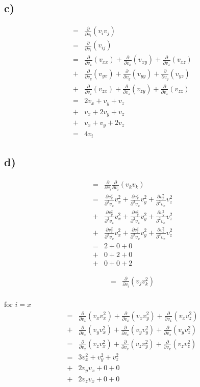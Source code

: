 \documentclass[paper=a4, fontsize=12pt]{scrartcl}
\begin{document}
\subsection*{c)}
\begin{align*}
=&\frac{\partial}{\partial v_i}(v_i v_j)\\
= &\frac{\partial}{\partial v_i}(v_{ij})\\
=&
 \frac{\partial}{\partial v_x}(v_{xx})
+\frac{\partial}{\partial v_x}(v_{xy})
+\frac{\partial}{\partial v_x}(v_{xz})\\
+& 
 \frac{\partial}{\partial v_y}(v_{yx})
+\frac{\partial}{\partial v_y}(v_{yy})
+\frac{\partial}{\partial v_y}(v_{yz})\\
+& 
 \frac{\partial}{\partial v_z}(v_{zx})
+\frac{\partial}{\partial v_z}(v_{zy})
+\frac{\partial}{\partial v_z}(v_{zz})\\
=& 
	2v_x + v_y + v_z\\
+&	v_x + 2v_y + v_z\\
+& 	v_x + v_y + 2v_z \\
=& 4v_i
\end{align*}

\subsection*{d)}
\begin{align*}
=&
\frac{\partial}{\partial v_i} \frac{\partial}{\partial v_i}(v_k v_k)\\
=& 
  \frac{\partial v^2_x}{\partial ^2 v_x}  v_x^2
+ \frac{\partial v^2_x}{\partial ^2 v_x}  v_y^2
+ \frac{\partial v^2_x}{\partial ^2 v_x}  v_z^2\\
+& 
  \frac{\partial v^2_y}{\partial ^2 v_x}  v_x^2
+ \frac{\partial v^2_y}{\partial ^2 v_x}  v_y^2
+ \frac{\partial v^2_y}{\partial ^2 v_x}  v_z^2\\
+&
  \frac{\partial v^2_z}{\partial ^2 v_x}  v_x^2
+ \frac{\partial v^2_z}{\partial ^2 v_x}  v_y^2
+ \frac{\partial v^2_z}{\partial ^2 v_x}  v_z^2\\
=& 
2 + 0 + 0 \\
+& 0 + 2 + 0\\
+& 0 + 0 + 2
\end{align*}

\begin{align*}
=& \frac{\partial}{\partial v_i}(v_j v_k^2)\\
\end{align*}

for $i = x $
\begin{align*}
=&
 \frac{\partial}{\partial v_x}(v_x v_x^2)
+\frac{\partial}{\partial v_x}(v_x v_y^2)
+\frac{\partial}{\partial v_x}(v_x v_z^2)\\
+& 
 \frac{\partial}{\partial v_x}(v_y v_x^2)
+\frac{\partial}{\partial v_x}(v_y v_y^2)
+\frac{\partial}{\partial v_x}(v_y v_z^2)\\
=&
 \frac{\partial}{\partial v_x}(v_z v_x^2)
+\frac{\partial}{\partial v_x}(v_z v_y^2)
+\frac{\partial}{\partial v_x}(v_z v_z^2)\\
=&
	3 v_x^2 + v_y^2 + v_z^2\\
+&  2 v_y v_x + 0 + 0 \\
+&  2v_zv_x + 0 + 0 
\end{align*}	
\end{document}
